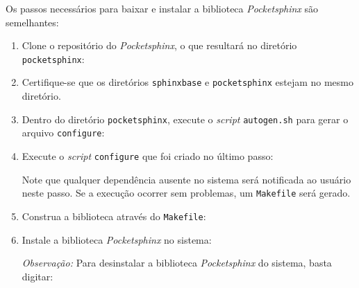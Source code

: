 Os passos necessários para baixar e instalar a biblioteca \emph{Pocketsphinx} são
semelhantes:

\begin{enumerate}
\item Clone o repositório do \emph{Pocketsphinx}, o que resultará no diretório
\texttt{pocketsphinx}:

\item Certifique-se que os diretórios \texttt{sphinxbase} e \texttt{pocketsphinx}
estejam no mesmo diretório.

\item Dentro do diretório \texttt{pocketsphinx}, execute o \emph{script}
\texttt{autogen.sh} para gerar o arquivo \texttt{configure}:

\item Execute o \emph{script} \texttt{configure} que foi criado no último passo:

Note que qualquer dependência ausente no sistema será notificada ao usuário neste
passo. Se a execução ocorrer sem problemas, um \texttt{Makefile} será gerado.

\item Construa a biblioteca através do \texttt{Makefile}:

\item Instale a biblioteca \emph{Pocketsphinx} no sistema:

\emph{Observação:} Para desinstalar a biblioteca \emph{Pocketsphinx} do sistema,
basta digitar:
\end{enumerate}
